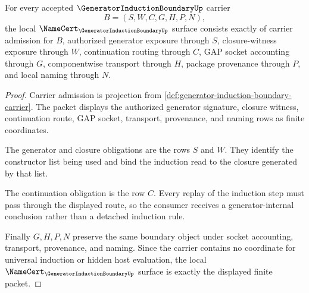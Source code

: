 \begin{theorem}
\label{thm:generator-induction-boundary-namecert-obligations}
For every accepted $\GeneratorInductionBoundaryUp$ carrier
$$
B=(S,W,C,G,H,P,N),
$$
the local $\NameCert_{\GeneratorInductionBoundaryUp}$ surface consists exactly of carrier admission for $B$, authorized generator exposure through $S$, closure-witness exposure through $W$, continuation routing through $C$, GAP socket accounting through $G$, componentwise transport through $H$, package provenance through $P$, and local naming through $N$.
\end{theorem}
\begin{proof}
Carrier admission is projection from \autoref{def:generator-induction-boundary-carrier}. The packet displays the authorized generator signature, closure witness, continuation route, GAP socket, transport, provenance, and naming rows as finite coordinates.

The generator and closure obligations are the rows $S$ and $W$. They identify the constructor list being used and bind the induction read to the closure generated by that list.

The continuation obligation is the row $C$. Every replay of the induction step must pass through the displayed route, so the consumer receives a generator-internal conclusion rather than a detached induction rule.

Finally $G,H,P,N$ preserve the same boundary object under socket accounting, transport, provenance, and naming. Since the carrier contains no coordinate for universal induction or hidden host evaluation, the local $\NameCert_{\GeneratorInductionBoundaryUp}$ surface is exactly the displayed finite packet.
\end{proof}

